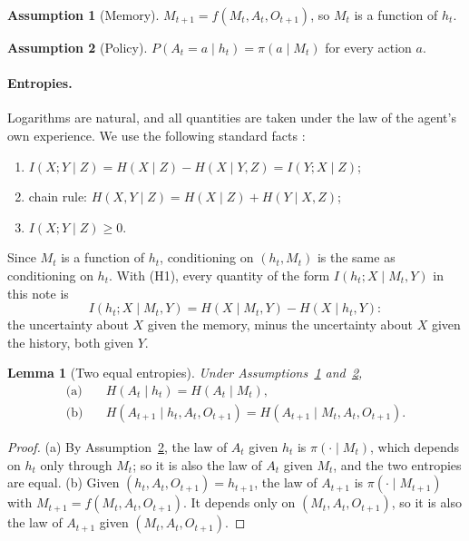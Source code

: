 \documentclass{article}
\newtheorem{lemma}{Lemma}
\theoremstyle{definition}
\newtheorem{assumption}{Assumption}
\theoremstyle{remark}
\begin{document}
\begin{assumption}[Memory]\label{as:mem}
$M_{t+1}=f(M_t,A_t,O_{t+1})$, so $M_t$ is a function of $h_t$.
\end{assumption}

\begin{assumption}[Policy]\label{as:pol}
$P(A_t=a\mid h_t)=\pi(a\mid M_t)$ for every action $a$.
\end{assumption}

\paragraph{Entropies.} Logarithms are natural, and all quantities are taken under the law of the agent's own experience. We use the following standard facts \citep[Ch.~2]{cover2006elements}:
\begin{enumerate}
\item[(H1)] $I(X;Y\mid Z)=H(X\mid Z)-H(X\mid Y,Z)=I(Y;X\mid Z)$;
\item[(H2)] chain rule: $H(X,Y\mid Z)=H(X\mid Z)+H(Y\mid X,Z)$;
\item[(H3)] $I(X;Y\mid Z)\ge0$.
\end{enumerate}
Since $M_t$ is a function of $h_t$, conditioning on $(h_t,M_t)$ is the same as conditioning on $h_t$. With (H1), every quantity of the form $I(h_t;X\mid M_t,Y)$ in this note is
\begin{equation}\label{eq:star}
I(h_t;X\mid M_t,Y)=H(X\mid M_t,Y)-H(X\mid h_t,Y):
\end{equation}
the uncertainty about $X$ given the memory, minus the uncertainty about $X$ given the history, both given $Y$.

\begin{lemma}[Two equal entropies]\label{lem:ci}
Under Assumptions~\ref{as:mem} and~\ref{as:pol},
\begin{align*}
\text{(a)}\quad&H(A_t\mid h_t)=H(A_t\mid M_t),\\
\text{(b)}\quad&H(A_{t+1}\mid h_t,A_t,O_{t+1})=H(A_{t+1}\mid M_t,A_t,O_{t+1}).
\end{align*}
\end{lemma}

\begin{proof}
(a) By Assumption~\ref{as:pol}, the law of $A_t$ given $h_t$ is $\pi(\cdot\mid M_t)$, which depends on $h_t$ only through $M_t$; so it is also the law of $A_t$ given $M_t$, and the two entropies are equal.
(b) Given $(h_t,A_t,O_{t+1})=h_{t+1}$, the law of $A_{t+1}$ is $\pi(\cdot\mid M_{t+1})$ with $M_{t+1}=f(M_t,A_t,O_{t+1})$. It depends only on $(M_t,A_t,O_{t+1})$, so it is also the law of $A_{t+1}$ given $(M_t,A_t,O_{t+1})$.
\end{proof}
\end{document}

